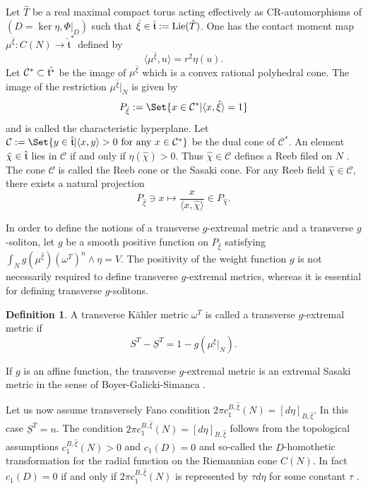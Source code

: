 \documentclass[12pt]{amsart}
\numberwithin{equation}{section}%
\theoremstyle{plain}
\theoremstyle{definition}
\newtheorem{definition}[theorem]{Definition}
\newcommand{\1}{\mathbf{1}}
\begin{document}
Let $\hat{T}$ be a real maximal compact torus acting effectively as CR-automorphisms of
$(D=\ker\eta, \Phi|_{D})$ such that
$\hat{\xi}\in\hat{\frak{t}}:=\mathrm{Lie}(\hat{T})$.
One has the contact moment map
$\mu^{\hat{\xi}}:C(N)\to\hat{\mathfrak{t}}^{*}$ defined by
\begin{equation}
\langle\mu^{\hat{\xi}},u\rangle=r^{2}\eta(u).
\end{equation}
Let $\mathcal{C}^{*}\subset\hat{\frak{t}^{*}}$ be
the image of $\mu^{\hat{\xi}}$
which is a convex rational polyhedral cone.
The image of the restriction $\mu^{\hat{\xi}}|_{N}$ is given by
\begin{equation}
P_{\hat{\xi}}:=\Set{x\in\mathcal{C}^{*} | \langle x,\hat{\xi}\rangle=1}
\end{equation}
and is called the characteristic hyperplane.
Let $\mathcal{C}:=\Set{y\in\hat{\frak{t}} | \langle x,y\rangle >0 \text{ for any } x\in\mathcal{C}^{*}}$
be the dual cone of $\mathcal{C}^{*}$.
An element $\hat{\chi}\in\hat{\frak{t}}$ lies in $\mathcal{C}$
if and only if $\eta(\hat{\chi})>0$.
Thus $\hat{\chi}\in\mathcal{C}$ defines a Reeb filed on $N$  \cite{HS16}.
The cone $\mathcal{C}$ is called the Reeb cone or the Sasaki cone.
For any Reeb field $\hat{\chi}\in\mathcal{C}$,
there exists a natural projection
\begin{equation}\label{projection}
P_{\hat{\xi}}\ni x\mapsto \frac{x}{\langle x,\hat{\chi}\rangle} \in P_{\hat{\chi}}.
\end{equation}

In order to define the notions of a transverse $g$-extremal metric
and a transverse $g$-soliton,
let $g$ be a smooth positive function on $P_{\hat{\xi}}$
satisfying $\int_{N}g(\mu^{\hat{\xi}})(\omega^{T})^{n}\wedge\eta=V$.
The positivity of the weight function 
$g$ is not necessarily required to define transverse
$g$-extremal metrics, whereas it is essential for defining transverse 
$g$-solitons.
\begin{definition}
A transverse K\"ahler metric $\omega^{T}$ is called a transverse
$g$-extremal metric if
\begin{equation}
S^{T}-\underline{S}^{T}=1-g(\mu^{\hat{\xi}}|_{N}).
\end{equation}
\end{definition}

If $g$ is an affine function, the transverse $g$-extremal metric
is an extremal Sasaki metric in the sense of
Boyer-Galicki-Simanca \cite{BGS08}.

Let us now assume transversely Fano condition
$2\pi c^{B,\hat{\xi}}_{1}(N)=[d\eta]_{B,\hat{\xi}}$.
In this case $\underline{S}^{T}=n$.
The condition $2\pi c^{B,\hat{\xi}}_{1}(N)=[d\eta]_{B,\hat{\xi}}$ follows from
the topological assumptions
$c^{B,\hat{\xi}}_{1}(N)>0$ and $c_{1}(D)=0$
and so-called the $D$-homothetic transformation for the radial function on
the Riemannian cone $C(N)$.
In fact $c_{1}(D)=0$ if and only if $2\pi c^{B,\hat{\xi}}_{1}(N)$ is represented by
$\tau d\eta$ for some constant $\tau$ \cite{FOW09}.
\end{document}
